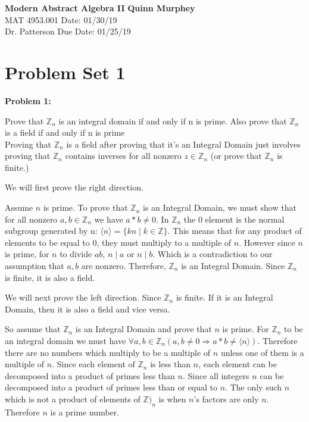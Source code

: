 \documentclass[a4paper, 11pt]{article}
\begin{document}
\noindent
\large\textbf{Modern Abstract Algebra II} \hfill \textbf{Quinn Murphey} \\
\normalsize MAT 4953.001 \hfill Date: 01/30/19 \\
Dr. Patterson \hfill Due Date: 01/25/19 \\
\noindent\makebox[\linewidth]{\rule{\paperwidth}{0.4pt}}

\section*{Problem Set 1}
\doublespacing
\textbf{Problem 1:}
    
    Prove that $\mathbb{Z}_n$ is an integral domain if and only if n is prime. Also prove that $\mathbb{Z}_n$ is a field if and only if n is prime \\
    
    Proving that $\mathbb{Z}_n$ is a field after proving that it's an Integral Domain just involves proving that $\mathbb{Z}_n$ contains inverses for all nonzero $z \in\mathbb{Z}_n$ (or prove that $\mathbb{Z}_n$ is finite.)
    
    We will first prove the right direction. 

    Assume $n$ is prime. To prove that $\mathbb{Z}_n$ is an Integral Domain, we must show that for all nonzero $a,b \in\mathbb{Z}_n{}$ we have $a*b\not = 0$. In $\mathbb{Z}_n$ the $0$ element is the normal subgroup generated by n: $\langle n\rangle = \{ kn \mid k\in\mathbb{Z}\}$. This means that for any product of elements to be equal to $0$, they must multiply to a multiple of $n$. However since $n$ is prime, for $n$ to divide $ab$, $n\mid a$ or $n\mid b$. Which is a contradiction to our assumption that $a,b$ are nonzero. Therefore, $\mathbb{Z}_n$ is an Integral Domain. Since $\mathbb{Z}_n$ is finite, it is also a field.
    
    We will next prove the left direction. Since $\mathbb{Z}_n$ is finite. If it is an Integral Domain, then it is also a field and vice versa.
    
    So assume that $\mathbb{Z}_n$ is an Integral Domain and prove that $n$ is prime. For $\mathbb{Z}_n$ to be an integral domain we must have $\forall a,b\in\mathbb{Z}_n(a,b\not = 0 \Rightarrow a*b \not = \langle n\rangle)$. Therefore there are no numbers which multiply to be a multiple of $n$ unless one of them is a multiple of $n$. Since each element of $\mathbb{Z}_n$ is less than $n$, each element can be decomposed into a product of primes less than $n$. Since all integers $n$ can be decomposed into a product of primes less than or equal to $n$. The only such $n$ which is not a product of elements of $\mathbb{Z})_n$ is when $n$'s factors are only $n$. Therefore $n$ is a prime number. 
    
\end{document}
